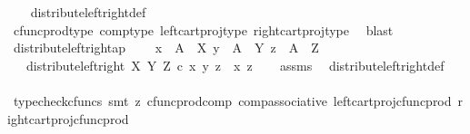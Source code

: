 \begin{isabellebody}
%
\isadelimproof
\ \ %
\endisadelimproof
%
\isatagproof
{}\isamarkupfalse%
\ distribute{\isacharunderscore}{\kern0pt}left{\isacharunderscore}{\kern0pt}right{\isacharunderscore}{\kern0pt}def\isanewline
\ \ \isamarkupfalse%
\ cfunc{\isacharunderscore}{\kern0pt}prod{\isacharunderscore}{\kern0pt}type\ comp{\isacharunderscore}{\kern0pt}type\ left{\isacharunderscore}{\kern0pt}cart{\isacharunderscore}{\kern0pt}proj{\isacharunderscore}{\kern0pt}type\ right{\isacharunderscore}{\kern0pt}cart{\isacharunderscore}{\kern0pt}proj{\isacharunderscore}{\kern0pt}type\ \isamarkupfalse%
\ blast%
\endisatagproof
{\isafoldproof}%
%
\isadelimproof
\isanewline
%
\endisadelimproof
\isanewline
{}\isamarkupfalse%
\ distribute{\isacharunderscore}{\kern0pt}left{\isacharunderscore}{\kern0pt}right{\isacharunderscore}{\kern0pt}ap{\isacharcolon}{\kern0pt}\ \isanewline
\ \ \ {\isachardoublequoteopen}x\ {\isacharcolon}{\kern0pt}\ A\ {\isasymrightarrow}\ X{\isachardoublequoteclose}\ {\isachardoublequoteopen}y\ {\isacharcolon}{\kern0pt}\ A\ {\isasymrightarrow}\ Y{\isachardoublequoteclose}\ {\isachardoublequoteopen}z\ {\isacharcolon}{\kern0pt}\ A\ {\isasymrightarrow}\ Z{\isachardoublequoteclose}\isanewline
\ \ \ {\isachardoublequoteopen}distribute{\isacharunderscore}{\kern0pt}left{\isacharunderscore}{\kern0pt}right\ X\ Y\ Z\ {\isasymcirc}\isactrlsub c\ {\isasymlangle}x{\isacharcomma}{\kern0pt}\ {\isasymlangle}y{\isacharcomma}{\kern0pt}\ z{\isasymrangle}{\isasymrangle}\ {\isacharequal}{\kern0pt}\ {\isasymlangle}x{\isacharcomma}{\kern0pt}\ z{\isasymrangle}{\isachardoublequoteclose}\isanewline
%
\isadelimproof
\ \ %
\endisadelimproof
%
\isatagproof
{}\isamarkupfalse%
\ assms\ \isamarkupfalse%
\ distribute{\isacharunderscore}{\kern0pt}left{\isacharunderscore}{\kern0pt}right{\isacharunderscore}{\kern0pt}def\ \ \isanewline
\ \ \isamarkupfalse%
\ {\isacharparenleft}{\kern0pt}typecheck{\isacharunderscore}{\kern0pt}cfuncs{\isacharcomma}{\kern0pt}\ smt\ {\isacharparenleft}{\kern0pt}z{}{\isacharparenright}{\kern0pt}\ cfunc{\isacharunderscore}{\kern0pt}prod{\isacharunderscore}{\kern0pt}comp\ comp{\isacharunderscore}{\kern0pt}associative{}\ left{\isacharunderscore}{\kern0pt}cart{\isacharunderscore}{\kern0pt}proj{\isacharunderscore}{\kern0pt}cfunc{\isacharunderscore}{\kern0pt}prod\ right{\isacharunderscore}{\kern0pt}cart{\isacharunderscore}{\kern0pt}proj{\isacharunderscore}{\kern0pt}cfunc{\isacharunderscore}{\kern0pt}prod{\isacharparenright}{\kern0pt}%

\end{isabellebody}
